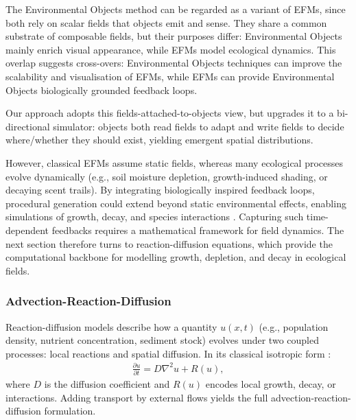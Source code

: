 The Environmental Objects method can be regarded as a variant of EFMs, since both rely on scalar fields that objects emit and sense. They share a common substrate of composable fields, but their purposes differ: Environmental Objects mainly enrich visual appearance, while EFMs model ecological dynamics. This overlap suggests cross-overs: Environmental Objects techniques can improve the scalability and visualisation of EFMs, while EFMs can provide Environmental Objects biologically grounded feedback loops.

Our approach adopts this fields-attached-to-objects view, but upgrades it to a bi-directional simulator: objects both read fields to adapt and write fields to decide where/whether they should exist, yielding emergent spatial distributions.

However, classical EFMs assume static fields, whereas many ecological processes evolve dynamically (e.g., soil moisture depletion, growth-induced shading, or decaying scent trails). By integrating biologically inspired feedback loops, procedural generation could extend beyond static environmental effects, enabling simulations of growth, decay, and species interactions \cite{Okubo2001,Wojtek2022}. Capturing such time-dependent feedbacks requires a mathematical framework for field dynamics. The next section therefore turns to reaction-diffusion equations, which provide the computational backbone for modelling growth, depletion, and decay in ecological fields.









\subsubsection{Advection-Reaction-Diffusion}

Reaction-diffusion models describe how a quantity $u(x,t)$ (e.g., population density, nutrient concentration, sediment stock) evolves under two coupled processes: local reactions and spatial diffusion. In its classical isotropic form \cite{Turing1952,Okubo2001}:
\begin{align}
    \label{eq:reaction-diffusion-classic}
    \frac{\partial u}{\partial t} = D \nabla^2 u + R(u),
\end{align}
where $D$ is the diffusion coefficient and $R(u)$ encodes local growth, decay, or interactions. Adding transport by external flows yields the full advection-reaction-diffusion formulation.

